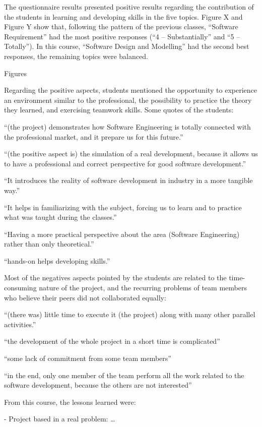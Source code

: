 The questionnaire results presented positive results regarding the contribution of the students in learning and developing skills in the five topics. Figure X and Figure Y show that, following the pattern of the previous classes, “Software Requirement” had the most positive responses (“4 – Substantially” and “5 – Totally”).  In this course, “Software Design and Modelling” had the second best responses, the remaining topics were balanced.

Figures

Regarding the positive aspects, students mentioned the opportunity to experience an environment similar to the professional, the possibility to practice the theory they learned, and exercising teamwork skills. Some quotes of the students:

“(the project) demonstrates how Software Engineering is totally connected with the professional market, and it prepare us for this future.”

“(the positive aspect is) the simulation of a real development, because it allows us to have a professional and correct perspective for good software development.”

“It introduces the reality of software development in industry in a more tangible way.”

“It helps in familiarizing with the subject, forcing us  to learn and to practice what was taught during the classes.”

“Having a more practical perspective about the area (Software Engineering) rather than only theoretical.”

“hands-on helps developing skills.”

Most of the negatives aspects pointed by the students are related to the time-consuming nature of the project, and the recurring problems of team members who believe their peers did not collaborated equally:

“(there was) little time to execute it (the project) along with many other parallel activities.”

“the development of the whole project in a short time is complicated”

“some lack of commitment from some team members”

“in the end, only one member of the team perform all the work related to the software development, because the others are not interested”

From this course, the lessons learned were:

-	Project based in a real problem: …

